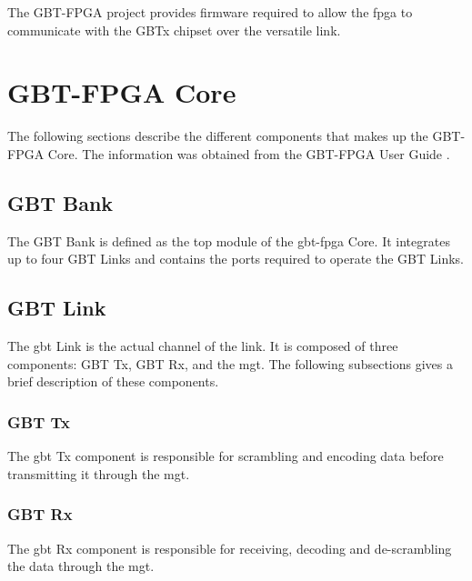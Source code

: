 \documentclass[main.tex]{subfiles}
\begin{document}

The GBT-FPGA project provides firmware required to allow the \gls{fpga} to communicate with the GBTx chipset over the versatile link.

\section{GBT-FPGA Core}
The following sections describe the different components that makes up the GBT-FPGA Core. The information was obtained from the GBT-FPGA User Guide \cite{gbt_fpga}.

\subsection{GBT Bank}
The GBT Bank is defined as the top module of the \gls{gbt}-\gls{fpga} Core. It integrates up to four GBT Links and contains the ports required to operate the GBT Links.

\subsection{GBT Link}
The \gls{gbt} Link is the actual channel of the link. It is composed of three components: GBT Tx, GBT Rx, and the \gls{mgt}. The following subsections gives a brief description of these components.

\subsubsection{GBT Tx}

The \gls{gbt} Tx component is responsible for scrambling and encoding data before transmitting it through the \gls{mgt}.

\subsubsection{GBT Rx}

The \gls{gbt} Rx component is responsible for receiving, decoding and de-scrambling the data through the \gls{mgt}.
\end{document}
